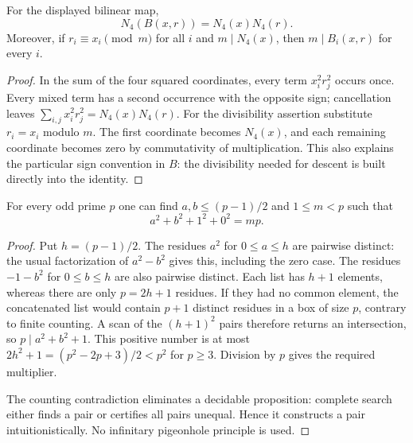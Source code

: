 \begin{lemma}\label{qr:four-product}
For the displayed bilinear map,
\[
 N_4(B(x,r))=N_4(x)N_4(r).
\]
Moreover, if $r_i\equiv x_i\pmod m$ for all $i$ and
$m\mid N_4(x)$, then $m\mid B_i(x,r)$ for every $i$.
\end{lemma}
\begin{proof}
In the sum of the four squared coordinates, every term $x_i^2r_j^2$
occurs once. Every mixed term has a second occurrence with the opposite
sign; cancellation leaves $\sum_{i,j}x_i^2r_j^2=N_4(x)N_4(r)$.
For the divisibility assertion substitute $r_i=x_i$ modulo $m$.
The first coordinate becomes $N_4(x)$, and each remaining coordinate
becomes zero by commutativity of multiplication. This also explains the
particular sign convention in $B$: the divisibility needed for descent
is built directly into the identity.
\end{proof}

\begin{lemma}\label{qr:four-seed}
For every odd prime $p$ one can find $a,b\le(p-1)/2$ and
$1\le m<p$ such that
\[
 a^2+b^2+1^2+0^2=mp.
\]
\end{lemma}
\begin{proof}
Put $h=(p-1)/2$. The residues $a^2$ for $0\le a\le h$ are
pairwise distinct: the usual factorization of $a^2-b^2$ gives this,
including the zero case. The residues $-1-b^2$ for $0\le b\le h$
are also pairwise distinct. Each list has $h+1$ elements, whereas
there are only $p=2h+1$ residues. If they had no common element,
the concatenated list would contain $p+1$ distinct residues in a box
of size $p$, contrary to finite counting. A scan of the
$(h+1)^2$ pairs therefore returns an intersection, so
$p\mid a^2+b^2+1$. This positive number is at most
$2h^2+1=(p^2-2p+3)/2<p^2$ for $p\ge3$. Division by $p$
gives the required multiplier.

The counting contradiction eliminates a decidable proposition: complete
search either finds a pair or certifies all pairs unequal. Hence it
constructs a pair intuitionistically. No infinitary pigeonhole principle
is used.
\end{proof}

